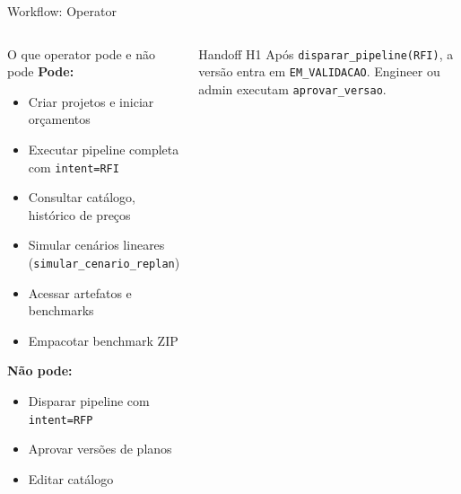 \documentclass[aspectratio=169,10pt]{beamer}
\begin{document}
\begin{frame}{Workflow: Operator}
\begin{columns}[T]
    \begin{block}{O que operator pode e não pode}
      \textbf{Pode:}
      \begin{itemize}\scriptsize
        \item Criar projetos e iniciar orçamentos
        \item Executar pipeline completa com \texttt{intent=RFI}
        \item Consultar catálogo, histórico de preços
        \item Simular cenários lineares (\texttt{simular\_cenario\_replan})
        \item Acessar artefatos e benchmarks
        \item Empacotar benchmark ZIP
      \end{itemize}
      \vspace{4pt}
      \textbf{Não pode:}
      \begin{itemize}\scriptsize
        \item Disparar pipeline com \texttt{intent=RFP}
        \item Aprovar versões de planos
        \item Editar catálogo
      \end{itemize}
    \end{block}
    \vspace{4pt}
    \begin{alertblock}{\small Handoff H1}
      \scriptsize Após \texttt{disparar\_pipeline(RFI)}, a versão entra em
      \texttt{EM\_VALIDACAO}. Engineer ou admin executam \texttt{aprovar\_versao}.
    \end{alertblock}
  \end{columns}
\end{frame}
\end{document}
